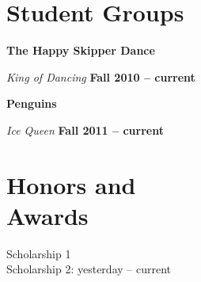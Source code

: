 \documentclass[margin,line]{resume}
\begin{document}
\begin{resume}
\section{\mysidestyle Student Groups}

 
\textbf{The Happy Skipper Dance} \vspace{0mm}\\\vspace{0mm}%

\textsl{King of Dancing } \hspace{10mm} \textbf{Fall 2010 -- current}%

 
\textbf{Penguins} \vspace{0mm}\\\vspace{0mm}%

\textsl{Ice Queen} \hspace{10mm} \textbf{Fall 2011 -- current}\\





\section{\mysidestyle Honors and\\Awards}

Scholarship 1 \vspace{1mm}\\

Scholarship 2: yesterday -- current \vspace{1mm}\\


\end{resume}
\end{document}
